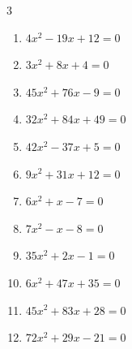 \begin{multicols}{3}
\begin{enumerate}

  \item $4x^{2}-19x+12=0$


  \item $3x^{2}+8x+4=0$


  \item $45x^{2}+76x-9=0$


  \item $32x^{2}+84x+49=0$


  \item $42x^{2}-37x+5=0$


  \item $9x^{2}+31x+12=0$


  \item $6x^{2}+x-7=0$


  \item $7x^{2}-x-8=0$


\columnbreak %

  \item $35x^{2}+2x-1=0$


  \item $6x^{2}+47x+35=0$


  \item $45x^{2}+83x+28=0$


  \item $72x^{2}+29x-21=0$



\end{enumerate}
\end{multicols}

